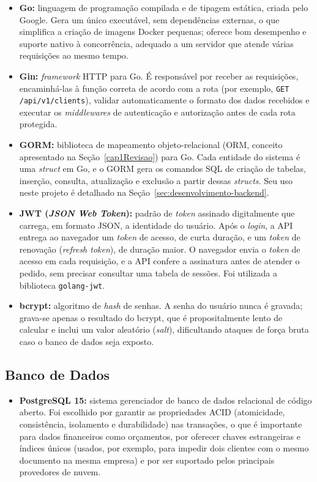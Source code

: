 \begin{itemize}
\item \textbf{Go:} linguagem de programação compilada e de tipagem estática, criada pelo Google. Gera um único executável, sem dependências externas, o que simplifica a criação de imagens Docker pequenas; oferece bom desempenho e suporte nativo à concorrência, adequado a um servidor que atende várias requisições ao mesmo tempo.
\item \textbf{Gin:} \textit{framework} HTTP para Go. É responsável por receber as requisições, encaminhá-las à função correta de acordo com a rota (por exemplo, \texttt{GET /\allowbreak{}api/\allowbreak{}v1/\allowbreak{}clients}), validar automaticamente o formato dos dados recebidos e executar os \textit{middlewares} de autenticação e autorização antes de cada rota protegida.
\item \textbf{GORM:} biblioteca de mapeamento objeto-relacional (ORM, conceito apresentado na Seção~\ref{cap1Revisao}) para Go. Cada entidade do sistema é uma \textit{struct} em Go, e o GORM gera os comandos SQL de criação de tabelas, inserção, consulta, atualização e exclusão a partir dessas \textit{structs}. Seu uso neste projeto é detalhado na Seção~\ref{sec:desenvolvimento-backend}.
\item \textbf{JWT (\textit{JSON Web Token}):} padrão de \textit{token} assinado digitalmente que carrega, em formato JSON, a identidade do usuário. Após o \textit{login}, a API entrega ao navegador um \textit{token} de acesso, de curta duração, e um \textit{token} de renovação (\textit{refresh token}), de duração maior. O navegador envia o \textit{token} de acesso em cada requisição, e a API confere a assinatura antes de atender o pedido, sem precisar consultar uma tabela de sessões. Foi utilizada a biblioteca \texttt{golang-jwt}.
\item \textbf{bcrypt:} algoritmo de \textit{hash} de senhas. A senha do usuário nunca é gravada; grava-se apenas o resultado do bcrypt, que é propositalmente lento de calcular e inclui um valor aleatório (\textit{salt}), dificultando ataques de força bruta caso o banco de dados seja exposto.
\end{itemize}

\subsection{Banco de Dados}

\begin{itemize}
\item \textbf{PostgreSQL 15:} sistema gerenciador de banco de dados relacional de código aberto. Foi escolhido por garantir as propriedades ACID (atomicidade, consistência, isolamento e durabilidade) nas transações, o que é importante para dados financeiros como orçamentos, por oferecer chaves estrangeiras e índices únicos (usados, por exemplo, para impedir dois clientes com o mesmo documento na mesma empresa) e por ser suportado pelos principais provedores de nuvem.
\end{itemize}

